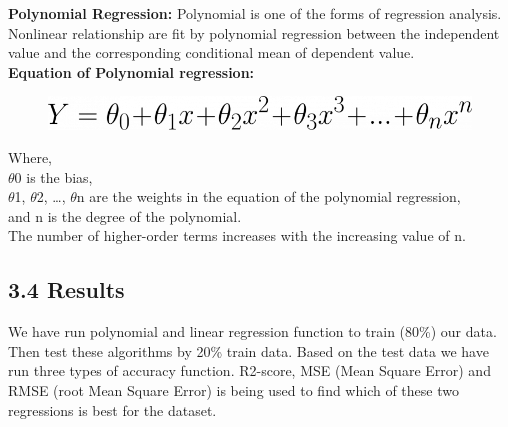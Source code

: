 \documentclass[conference]{IEEEtran}[10]
\begin{document}
\textbf{Polynomial Regression:}
Polynomial is one of the forms of regression analysis. Nonlinear relationship are fit by polynomial regression between the independent value and the corresponding conditional mean of dependent value. 
\\\textbf{Equation of Polynomial regression:}
\begin{figure}[H]
\centering
\includegraphics[scale=0.35]{pe}
\end{figure}
Where,
\\$\theta$0 is the bias,
\\$\theta$1, $\theta$2, …, $\theta$n are the weights in the equation of the polynomial regression,
\\and n is the degree of the polynomial.
\\The number of higher-order terms increases with the increasing value of n.
\subsection{3.4 Results}
We have run polynomial and linear regression function to train (80\%) our data. Then test these algorithms by 20\% train data. Based on the test data we have run three types of accuracy function. R2-score, MSE (Mean Square Error) and RMSE (root Mean Square Error) is being used to find which of these two regressions is best for the dataset.
\end{document}
